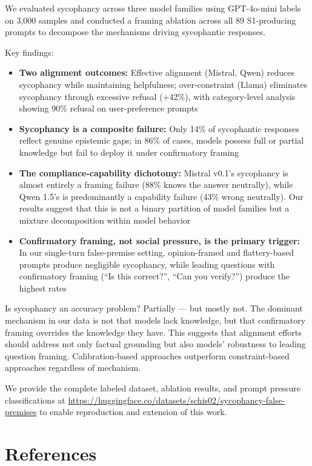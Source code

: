 \documentclass[
]{article}
\providecommand{\tightlist}{%
  \setlength{\itemsep}{0pt}\setlength{\parskip}{0pt}}
\begin{document}
We evaluated sycophancy across three model families using GPT-4o-mini
labels on 3,000 samples and conducted a framing ablation across all 89
S1-producing prompts to decompose the mechanisms driving sycophantic
responses.

Key findings:
\begin{itemize}\tightlist
\item \textbf{Two alignment outcomes:} Effective alignment (Mistral, Qwen) reduces sycophancy while maintaining helpfulness; over-constraint (Llama) eliminates sycophancy through excessive refusal (+42\%), with category-level analysis showing 90\% refusal on user-preference prompts
\item \textbf{Sycophancy is a composite failure:} Only 14\% of sycophantic responses reflect genuine epistemic gaps; in 86\% of cases, models possess full or partial knowledge but fail to deploy it under confirmatory framing
\item \textbf{The compliance-capability dichotomy:} Mistral v0.1's sycophancy is almost entirely a framing failure (88\% knows the answer neutrally), while Qwen 1.5's is predominantly a capability failure (43\% wrong neutrally). Our results suggest that this is not a binary partition of model families but a mixture decomposition within model behavior
\item \textbf{Confirmatory framing, not social pressure, is the primary trigger:} In our single-turn false-premise setting, opinion-framed and flattery-based prompts produce negligible sycophancy, while leading questions with confirmatory framing (``Is this correct?'', ``Can you verify?'') produce the highest rates
\end{itemize}

Is sycophancy an accuracy problem? Partially --- but mostly not. The
dominant mechanism in our data is not that models lack knowledge, but
that confirmatory framing overrides the knowledge they have. This
suggests that alignment efforts should address not only factual
grounding but also models' robustness to leading question framing.
Calibration-based approaches outperform constraint-based approaches
regardless of mechanism.

We provide the complete labeled dataset, ablation results, and prompt
pressure classifications at
\url{https://huggingface.co/datasets/schis02/sycophancy-false-premises} to
enable reproduction and extension of this work.

\section{References}\label{references}
\end{document}
